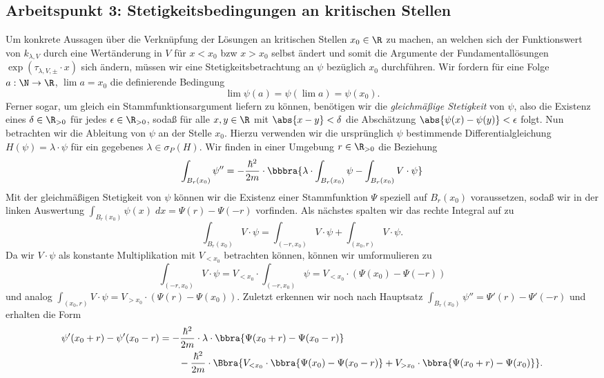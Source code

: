 \documentclass{subfiles}
\begin{document}
    \subsection{Arbeitspunkt 3: Stetigkeitsbedingungen an kritischen Stellen}
        Um konkrete Aussagen über die Verknüpfung der Lösungen an kritischen Stellen $x_0\in\R$ zu machen, an welchen sich der Funktionswert von $k_{\lambda,V}$ durch eine Wertänderung in $V$ für $x<x_0$ bzw $x>x_0$ selbst ändert und somit die Argumente der Fundamentallösungen $\exp(\tau_{\lambda,V,\pm}\cdot x)$ sich ändern, müssen wir eine Stetigkeitsbetrachtung an $\psi$ bezüglich $x_0$ durchführen. Wir fordern für eine Folge $a:\N\to\R$, $\lim a = x_0$ die definierende Bedingung
        \[
            \lim \psi(a) = \psi(\lim a) = \psi(x_0). 
        \] 
        Ferner sogar, um gleich ein Stammfunktionsargument liefern zu können, benötigen wir die \emph{gleichmäßige Stetigkeit} von $\psi$, also die Existenz eines $\delta\in\R_{>0}$ für jedes $\epsilon\in\R_{>0}$, sodaß für alle $x,y\in\R$ mit $\abs{x-y}<\delta$ die Abschätzung $\abs{\psi(x)-\psi(y)}<\epsilon$ folgt. 
        Nun betrachten wir die Ableitung von $\psi$ an der Stelle $x_0$. Hierzu verwenden wir die ursprünglich $\psi$ bestimmende Differentialgleichung $H(\psi) = \lambda\cdot\psi$ für ein gegebenes $\lambda\in\sigma_P(H)$. Wir finden in einer Umgebung $r\in\R_{>0}$ die Beziehung
        \[
            \int_{B_r(x_0)}\psi'' = -\frac{\hbar^2}{2m}\cdot \bbbra{
                \lambda\cdot\int_{B_r(x_0)}\psi - \int_{B_r(x_0)}V\cdot\psi
            }
        \] 
        Mit der gleichmäßigen Stetigkeit von $\psi$ können wir die Existenz einer Stammfunktion $\Psi$ speziell auf $B_r(x_0)$ voraussetzen, sodaß wir in der linken Auswertung $\int_{B_r(x_0)}\psi(x)\; dx = \Psi(r) - \Psi(-r)$ vorfinden. Als nächstes spalten wir das rechte Integral auf zu 
        \[
            \int_{B_r(x_0)}V\cdot\psi = \int_{(-r,x_0)}V\cdot\psi + \int_{(x_0,r)}V\cdot\psi.
        \]
        Da wir $V\cdot\psi$ als konstante Multiplikation mit $V_{<x_0}$ betrachten können, können wir umformulieren zu 
        \[
            \int_{(-r,x_0)}V\cdot\psi = V_{<x_0}\cdot\int_{(-r,x_0)}\psi = V_{<x_0}\cdot(\Psi(x_0) - \Psi(-r))
        \]
        und analog $\int_{(x_0,r)}V\cdot\psi = V_{>x_0}\cdot(\Psi(r) - \Psi(x_0))$. Zuletzt erkennen wir noch nach Hauptsatz $\int_{B_r(x_0)}\psi'' = \Psi'(r) - \Psi'(-r)$ und erhalten die Form
        \begin{align*}
            \psi'(x_0 + r) - \psi'(x_0-r) &= -\frac{\hbar^2}{2m}\cdot \lambda\cdot\bbra{\Psi(x_0 + r) - \Psi(x_0 - r)} \\
            &\qquad - \frac{\hbar^2}{2m}\cdot\Bbra{
                V_{<x_0}\cdot\bbra{\Psi(x_0) - \Psi(x_0 - r)} + V_{>x_0}\cdot\bbra{\Psi(x_0 + r) - \Psi(x_0)}
            }.
        \end{align*}
\end{document}

